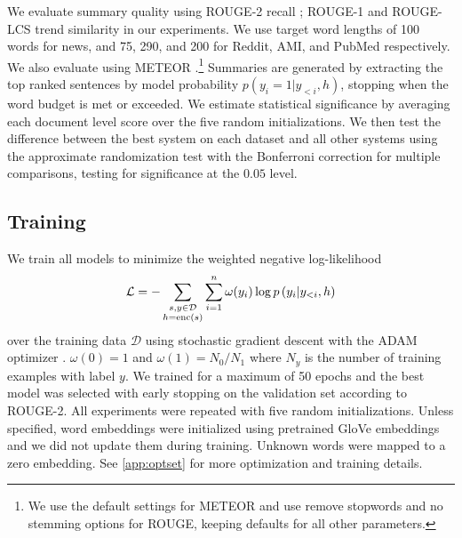 
We evaluate summary quality using ROUGE-2 recall \cite{lin2004rouge};
ROUGE-1 and ROUGE-LCS trend similarity in our experiments.
We use target word lengths of 100 words for news, and 
75, 290, and 200 for Reddit, AMI, and PubMed respectively.
We also evaluate using METEOR \cite{denkowski:lavie:meteor-wmt:2014}.\footnote{We use the default settings for METEOR and use remove stopwords and no stemming options for ROUGE, keeping defaults for all other parameters.}
Summaries are generated by extracting the top ranked sentences by model probability $p(y_i=1|y_{<i},h)$, stopping when the word budget is met or exceeded.
We estimate statistical significance by averaging each document level score
over the five random initializations. 
We then test the difference between the best system on each dataset and 
all other systems using the approximate randomization test 
\cite{riezler2005some} with the Bonferroni correction for multiple comparisons,
testing for significance at the $0.05$ level. 

\subsection{Training}

We train all models to minimize the weighted negative log-likelihood
\[\mathcal{L} = -\sum_{\substack{ s,y\in \mathcal{D} \\ h = \operatorname{enc}(s) } } \sum_{i=1}^{n} \omega(y_i) \log p\left(y_i|y_{<i},
h \right)\]
over the training data $\mathcal{D}$
using stochastic gradient descent with the ADAM optimizer
\cite{kingma2014adam}.
$\omega(0)=1$ and $\omega(1) = N_0/N_1$ where $N_y$ is the number of 
training examples with label $y$.
    We trained for a maximum of 50 epochs and the best
    model was selected with early stopping on the validation set according
    to ROUGE-2. {\color{red}{Each epoch constitutes a full pass through the
    dataset. The average stopping epoch was: CNN-DailyMail, 16.2; NYT, 21.36; DUC, 37.11; Reddit, 36.59; AMI, 19.58; PubMed, 19.84.
    }} All experiments were repeated with five random
    initializations.     Unless specified, word embeddings were initialized 
    using pretrained GloVe embeddings \cite{pennington2014glove} and we did 
    not update them during training. Unknown words were mapped to a zero 
    embedding.
    See \autoref{app:optset} for more optimization and training details.


